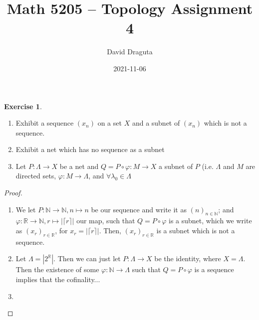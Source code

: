 \documentclass[12pt]{extarticle}
\title{ Math 5205 -- Topology Assignment 4}
\author{David Draguta}
\date{2021-11-06}
\newcommand{\abs}[1]{|#1|}
\newcommand{\R}{\mathbb{R}}
\newcommand{\N}{\mathbb{N}}
\newcommand{\<}{\langle}
\renewcommand{\>}{\rangle}
\theoremstyle{definition}
\newtheorem{exercise}{Exercise}
\begin{document}
\maketitle

\begin{exercise}
  \begin{enumerate}
  \item
    Exhibit a sequence $(x_n)$ on a set $X$ and a subnet of $(x_n)$ which is not a sequence.
  \item
    Exhibit a net which has no sequence as a subnet
  \item
    Let $P: \Lambda \to X$ be a net and $Q = P \circ \varphi : M \to X$ a subnet of $P$ (i.e. $\Lambda$ and $M$ are directed sets, $\varphi: M \to \Lambda$, and $\forall \lambda_0 \in \Lambda$ 
  \end{enumerate}
\end{exercise}
\begin{proof}
  \begin{enumerate}
  \item
    We let $P: \N \to \N, n \mapsto n$ be our sequence and write it as $(n)_{n \in \N}$; and $\varphi : \R \to \N, r \mapsto \abs{\lceil r \rceil} $ our map,
    such that $Q = P \circ \varphi$ is a subnet, which we write as $(x_r)_{r \in \R}$, for $x_r = \abs{\lceil r \rceil}$. Then, $(x_r)_{r \in \R}$ is a subnet which is not a sequence. 
  \item
    Let $\Lambda = \abs{2^{\R}}$. Then we can just let $P: \Lambda \to X$ be the identity, where $X = \Lambda$. Then the existence of some $\varphi: \N \to \Lambda$ such that $Q = P \circ \varphi$
    is a sequence implies that the cofinality...
  \item

  \end{enumerate}
\end{proof}
\end{document}
